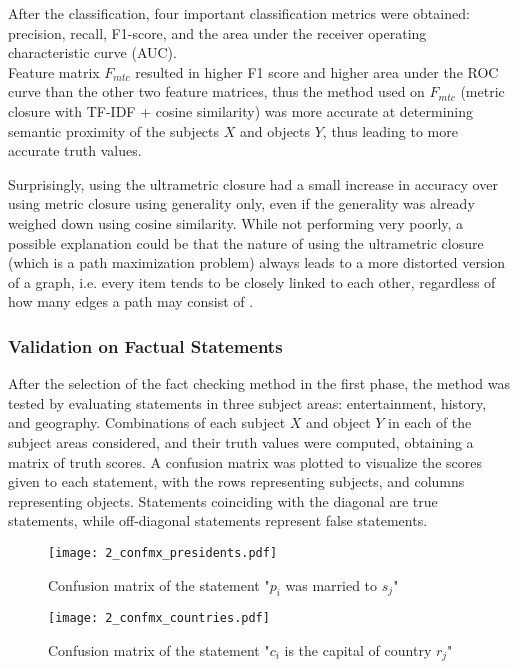 \documentclass[10pt,11pt,12pt,oneside]{book}
\begin{document}
After the classification, four important classification metrics were obtained: precision, recall, F1-score, and the area under the receiver operating characteristic curve (AUC).\\

Feature matrix $ F_{mtc} $ resulted in higher F1 score and higher area under the ROC curve than the other two feature matrices, thus the method used on $ F_{mtc} $ (metric closure with TF-IDF + cosine similarity) was more accurate at determining semantic proximity of the subjects $ X $ and objects $ Y $, thus leading to more accurate truth values.
	
Surprisingly, using the ultrametric closure had a small increase in accuracy over using metric closure using generality only, even if the generality was already weighed down using cosine similarity. While not performing very poorly, a possible explanation could be that the nature of using the ultrametric closure (which is a path maximization problem) always leads to a more distorted version of a graph, i.e. every item tends to be closely linked to each other, regardless of how many edges a path may consist of \cite{simas2015distance}.

\subsubsection{Validation on Factual Statements}

After the selection of the fact checking method in the first phase, the method was tested by evaluating statements in three subject areas: entertainment, history, and geography. Combinations of each subject $ X $ and object $ Y $ in each of the subject areas considered, and their truth values were computed, obtaining a matrix of truth scores. A confusion matrix was plotted to visualize the scores given to each statement, with the rows representing subjects, and columns representing objects. Statements coinciding with the diagonal are true statements, while off-diagonal statements represent false statements.

\begin{figure}[H]
	\begin{center}
		\texttt{[image: 2\_confmx\_presidents.pdf]}\\
		\caption{Confusion matrix of the statement "$ p_{i} $ was married to $ s_{j} $"}
	\end{center}
\end{figure}

\begin{figure}[H]
	\begin{center}
		\texttt{[image: 2\_confmx\_countries.pdf]}\\
		\caption{Confusion matrix of the statement "$ c_{i} $ is the capital of country $ r_{j} $"}
	\end{center}
\end{figure}
\end{document}
